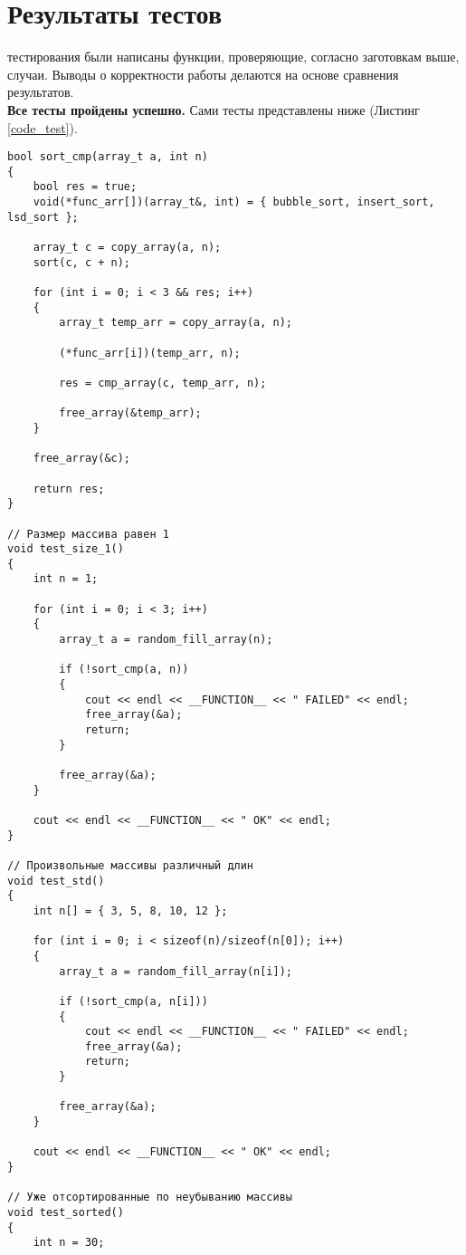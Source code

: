 \section{Результаты тестов}
 тестирования были написаны функции, проверяющие, согласно заготовкам выше, случаи. Выводы о корректности работы делаются на основе сравнения результатов.\\

\textbf{Все тесты пройдены успешно.} Сами тесты представлены ниже (Листинг \ref{code_test}).\\

\begin{lstlisting}[label=code_test, caption = Тесты]
bool sort_cmp(array_t a, int n)
{
	bool res = true;
	void(*func_arr[])(array_t&, int) = { bubble_sort, insert_sort, lsd_sort };
	
	array_t c = copy_array(a, n);
	sort(c, c + n);
	
	for (int i = 0; i < 3 && res; i++)
	{
		array_t temp_arr = copy_array(a, n);
		
		(*func_arr[i])(temp_arr, n);
		
		res = cmp_array(c, temp_arr, n);
		
		free_array(&temp_arr);
	}
	
	free_array(&c);
	
	return res;
}

// Размер массива равен 1
void test_size_1()
{
	int n = 1;
	
	for (int i = 0; i < 3; i++)
	{
		array_t a = random_fill_array(n);
		
		if (!sort_cmp(a, n))
		{
			cout << endl << __FUNCTION__ << " FAILED" << endl;
			free_array(&a);
			return;
		}
		
		free_array(&a);
	}
	
	cout << endl << __FUNCTION__ << " OK" << endl;
}

// Произвольные массивы различный длин
void test_std()
{
	int n[] = { 3, 5, 8, 10, 12 };
	
	for (int i = 0; i < sizeof(n)/sizeof(n[0]); i++)
	{
		array_t a = random_fill_array(n[i]);
		
		if (!sort_cmp(a, n[i]))
		{
			cout << endl << __FUNCTION__ << " FAILED" << endl;
			free_array(&a);
			return;
		}
		
		free_array(&a);
	}
	
	cout << endl << __FUNCTION__ << " OK" << endl;
}

// Уже отсортированные по неубыванию массивы
void test_sorted()
{
	int n = 30;
	

\end{lstlisting}
